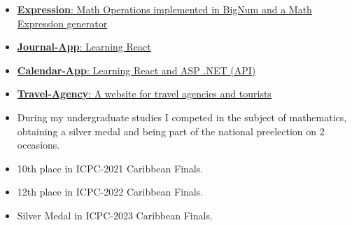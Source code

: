 \documentclass[9pt]{developercv} %
\begin{document}
\begin{minipage}[t]{0.45\textwidth}
	\vspace{-\baselineskip} %


	\begin{itemize}
		\item {\href{https://github.com/raudel25/Expression}{\textbf{Expression}: Math Operations implemented in BigNum and a Math Expression generator}}
		\item {\href{https://github.com/raudel25/Journal-App}{\textbf{Journal-App}: Learning React}}
		\item {\href{https://github.com/raudel25/Calendar-App}{\textbf{Calendar-App}: Learning React and ASP .NET (API)}}
		\item {\href{https://github.com/Jara-Devs/Travel-Agency}{\textbf{Travel-Agency}: A website for travel agencies and tourists}}
	\end{itemize}
\end{minipage}
\hfill
\begin{minipage}[t]{0.45\textwidth}
	\vspace{-\baselineskip} %


	\begin{itemize}
		\item During my undergraduate studies I competed in the subject of mathematics, obtaining a
		      silver medal and being part of the national preelection on 2 occasions.
		\item 10th place in ICPC-2021 Caribbean Finals.
		\item 12th place in ICPC-2022 Caribbean Finals.
		\item Silver Medal in ICPC-2023 Caribbean Finals.
	\end{itemize}

\end{minipage}



\end{document}
